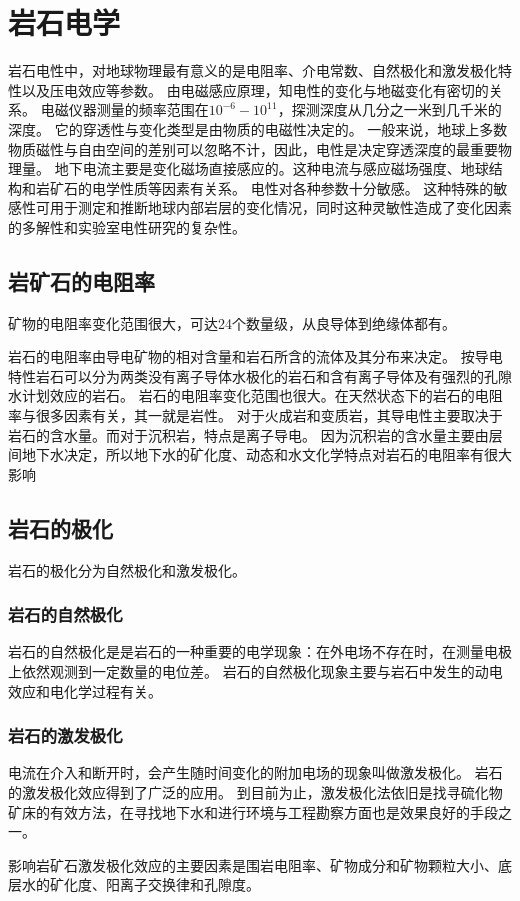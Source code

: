 \documentclass[hyperref,UTF-8,twoside]{ctexart}
\begin{document}
\section{岩石电学}
岩石电性中，对地球物理最有意义的是电阻率、介电常数、自然极化和激发极化特性以及压电效应等参数。
由电磁感应原理，知电性的变化与地磁变化有密切的关系。
电磁仪器测量的频率范围在$10^{-6}-10^{11}$，探测深度从几分之一米到几千米的深度。
它的穿透性与变化类型是由物质的电磁性决定的。
一般来说，地球上多数物质磁性与自由空间的差别可以忽略不计，因此，电性是决定穿透深度的最重要物理量。
地下电流主要是变化磁场直接感应的。这种电流与感应磁场强度、地球结构和岩矿石的电学性质等因素有关系。
电性对各种参数十分敏感。
这种特殊的敏感性可用于测定和推断地球内部岩层的变化情况，同时这种灵敏性造成了变化因素的多解性和实验室电性研究的复杂性。
\subsection{岩矿石的电阻率}
矿物的电阻率变化范围很大，可达24个数量级，从良导体到绝缘体都有。

岩石的电阻率由导电矿物的相对含量和岩石所含的流体及其分布来决定。
按导电特性岩石可以分为两类没有离子导体水极化的岩石和含有离子导体及有强烈的孔隙水计划效应的岩石。
岩石的电阻率变化范围也很大。在天然状态下的岩石的电阻率与很多因素有关，其一就是岩性。
对于火成岩和变质岩，其导电性主要取决于岩石的含水量。而对于沉积岩，特点是离子导电。
因为沉积岩的含水量主要由层间地下水决定，所以地下水的矿化度、动态和水文化学特点对岩石的电阻率有很大影响
\subsection{岩石的极化}
岩石的极化分为自然极化和激发极化。
\subsubsection{岩石的自然极化}
岩石的自然极化是是岩石的一种重要的电学现象：在外电场不存在时，在测量电极上依然观测到一定数量的电位差。
岩石的自然极化现象主要与岩石中发生的动电效应和电化学过程有关。
\subsubsection{岩石的激发极化}
电流在介入和断开时，会产生随时间变化的附加电场的现象叫做激发极化。
岩石的激发极化效应得到了广泛的应用。
到目前为止，激发极化法依旧是找寻硫化物矿床的有效方法，在寻找地下水和进行环境与工程勘察方面也是效果良好的手段之一。

影响岩矿石激发极化效应的主要因素是围岩电阻率、矿物成分和矿物颗粒大小、底层水的矿化度、阳离子交换律和孔隙度。
\end{document}

